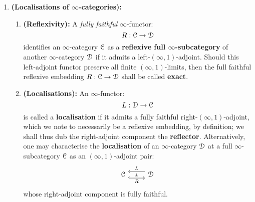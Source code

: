                 \begin{definition} \label{def: infinity_topoi}
                    \noindent
                    \begin{enumerate}
                        \item \textbf{(Localisations of $\infty$-categories):} 
                            \begin{enumerate}
                                \item \textbf{(Reflexivity):} A \textit{fully faithful} $\infty$-functor:
                                    $$R: \mathcal{C} \to \mathcal{D}$$
                                identifies an $\infty$-category $\mathcal{C}$ as a \textbf{reflexive full $\infty$-subcategory} of another $\infty$-category $\mathcal{D}$ if it admits a left-$(\infty, 1)$-adjoint. Should this left-adjoint functor preserve all finite $(\infty, 1)$-limits, then the full faithful reflexive embedding $R: \mathcal{C} \to \mathcal{D}$ shall be called \textbf{exact}.
                                \item \textbf{(Localisations):} An $\infty$-functor:
                                    $$L: \mathcal{D} \to \mathcal{C}$$
                                is called a \textbf{localisation} if it admits a fully faithful right-$(\infty, 1)$-adjoint, which we note to necessarily be a reflexive embedding, by definition; we shall thus dub the right-adjoint component the \textbf{reflector}. Alternatively, one may characterise the \textbf{localisation} of an $\infty$-category $\mathcal{D}$ at a full $\infty$-subcategory $\mathcal{C}$ as an $(\infty, 1)$-adjoint pair:
                                    $$
                                        \begin{tikzcd}
                                        	\C & \D
                                        	\arrow[""{name=0, anchor=center, inner sep=0}, "L"', shift right=2, from=1-2, to=1-1]
                                        	\arrow[""{name=1, anchor=center, inner sep=0}, "R"', shift right=2, hook, from=1-1, to=1-2]
                                        	\arrow["\dashv"{anchor=center, rotate=-90}, draw=none, from=0, to=1]
                                        \end{tikzcd}
                                    $$
                                whose right-adjoint component is fully faithful. 
                                

\end{enumerate}
\end{enumerate}
\end{definition}

